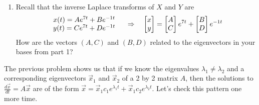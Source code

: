 \begin{problem}
\begin{enumerate}
\item Recall that the inverse Laplace transforms of $X$ and $Y$ are
$$
\begin{array}{c}
x(t)=Ae^{7t}+Be^{-1t}\\
y(t)=Ce^{7t}+De^{-1t}
\end{array}
\quad\Rightarrow\quad
\begin{bmatrix} x\\y \end{bmatrix}=\begin{bmatrix} A\\C \end{bmatrix}e^{7t} + \begin{bmatrix} B\\D \end{bmatrix}e^{-1t}
$$
How are the vectors $(A,C)$ and $(B,D)$ related to the eigenvectors in your bases from part 1? %
\end{enumerate}

\end{problem}

The previous problem shows us that if we know the eigenvalues $\lambda_1\neq \lambda_2$ and a corresponding eigenvectors $\vec x_1$ and $\vec x_2$ of a 2 by 2 matrix $A$, then the solutions to $\frac{d\vec x}{dt}=A\vec x$ are of the form $\vec x = \vec x_1 c_1 e^{\lambda_1 t}+\vec x_1 c_2 e^{\lambda_2 t}$.  Let's check this pattern one more time.















